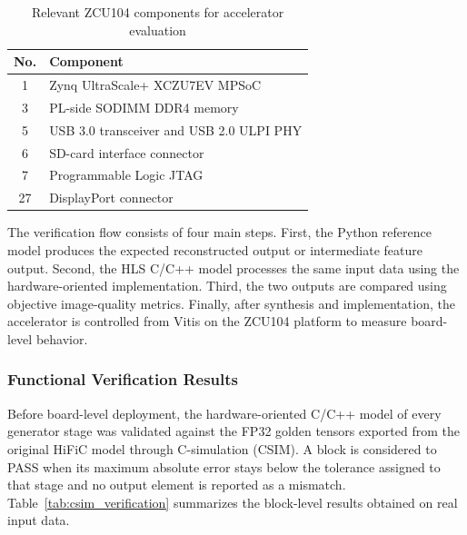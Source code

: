 \begin{table}[H]
    \centering
    \caption{Relevant ZCU104 components for accelerator evaluation}
    \label{tab:zcu104_components}
    \begin{tabular}{|c|l|}
        \hline
        \textbf{No.} & \textbf{Component} \\
        \hline
        1 & Zynq UltraScale+ XCZU7EV MPSoC \\
        \hline
        3 & PL-side SODIMM DDR4 memory \\
        \hline
        5 & USB 3.0 transceiver and USB 2.0 ULPI PHY \\
        \hline
        6 & SD-card interface connector \\
        \hline
        7 & Programmable Logic JTAG \\
        \hline
        27 & DisplayPort connector \\
        \hline
    \end{tabular}
\end{table}

The verification flow consists of four main steps. First, the Python reference model produces the expected reconstructed output or intermediate feature output. Second, the HLS C/C++ model processes the same input data using the hardware-oriented implementation. Third, the two outputs are compared using objective image-quality metrics. Finally, after synthesis and implementation, the accelerator is controlled from Vitis on the ZCU104 platform to measure board-level behavior.

\subsubsection{Functional Verification Results}

Before board-level deployment, the hardware-oriented C/C++ model of every generator stage was validated against the FP32 golden tensors exported from the original HiFiC model through C-simulation (CSIM). A block is considered to PASS when its maximum absolute error stays below the tolerance assigned to that stage and no output element is reported as a mismatch. Table~\ref{tab:csim_verification} summarizes the block-level results obtained on real input data.

